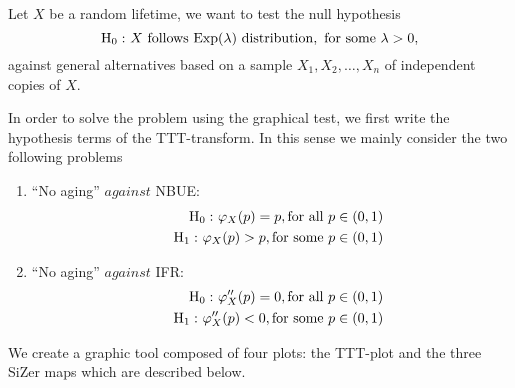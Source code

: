 \documentclass[preprint,12pt]{elsarticle}
\begin{document}
 \noindent Let $X$ be a random lifetime, we want to test the null hypothesis 
\[
{\rm H_0 :} \ X \ {\rm follows \ Exp}(\lambda) \ {\rm distribution,\ for \ some \ } \lambda >0,
\]
against general alternatives based on a sample $X_1, X_2,\ldots, X_n$ of independent copies of $X$.

In order to solve the problem using the graphical test, we first write the hypothesis terms of the TTT-transform. In this sense we mainly consider the two following problems
\begin{enumerate}

\item ``No aging'' $against$ NBUE:
\begin{eqnarray} \label{test_nbue}
\nonumber &&{\rm H_0 :} \ \varphi_X(p)= p, {\rm for \ all \ } p \in (0,1) \\
&&{\rm H_1 :} \ \varphi_X(p) >  p, {\rm for \ some \ }  p \in (0,1)
\end{eqnarray}


\item ``No aging'' $against$ IFR:
\begin{eqnarray} \label{test_ifr}
\nonumber &&{\rm H_0 :} \ \varphi_X''(p)= 0, {\rm for \ all \ } p \in (0,1) \\
&&{\rm H_1 :} \ \varphi_X''(p) < 0, {\rm for \ some \ }  p \in (0,1)
\end{eqnarray}

\end{enumerate}



We create a graphic tool composed of  four plots: the TTT-plot and the three SiZer maps which are described below.
\end{document}
